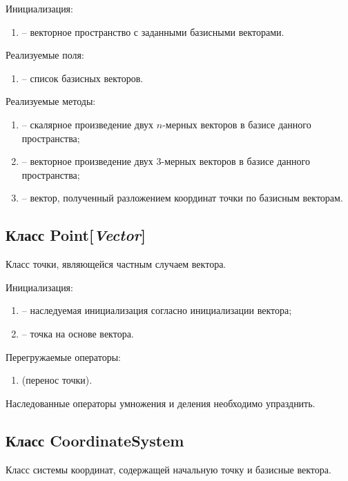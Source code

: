	\noindent Инициализация:
	\begin{enumerate}
		\item {} -- векторное пространство с заданными базисными векторами.
	\end{enumerate}

	\noindent Реализуемые поля:
	\begin{enumerate}
		\item {} -- список базисных векторов.
	\end{enumerate}

	\noindent Реализуемые методы:
	\begin{enumerate}
		\item {} -- скалярное произведение двух $n$-мерных векторов в базисе данного пространства;
		\item {} -- векторное произведение двух 3-мерных векторов в базисе данного пространства;
		\item {} -- вектор, полученный разложением координат точки по базисным векторам.
	\end{enumerate}

\subsection{Класс Point[\textit{Vector}]}
	\noindent Класс точки, являющейся частным случаем вектора. 

	\noindent Инициализация:
	\begin{enumerate}
		\item {} -- наследуемая инициализация согласно инициализации вектора;
		\item {} -- точка на основе вектора.
	\end{enumerate}

	\noindent Перегружаемые операторы:
	\begin{enumerate}
		\item {} (перенос точки).
	\end{enumerate}

	Наследованные операторы умножения и деления необходимо упразднить.

\subsection{Класс CoordinateSystem}
	\noindent Класс системы координат, содержащей начальную точку и базисные вектора.

